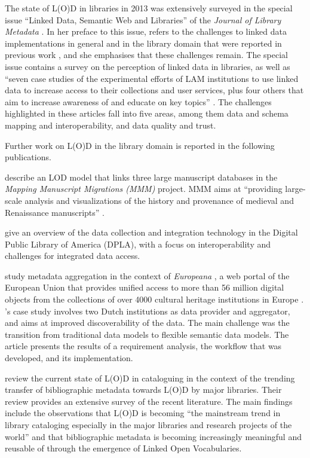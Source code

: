 The state of L(O)D in libraries in 2013 was extensively surveyed in the special issue
\enquote{Linked Data, Semantic Web and Libraries} of the \emph{Journal of Library Metadata} \autocite{JLM13_2-3}.
In her preface to this issue, \textcite{Bair2013} refers to the challenges to linked data implementations
in general and in the library domain that were reported in previous work
\autocite{Bizer2009,Byrne2010,Gonzalez2011,Alemu2012},
and she emphasises that these challenges remain.
The special issue contains a survey on the perception of linked data in libraries,
as well as
\enquote{seven case studies of the experimental efforts of LAM institutions to use linked data to increase access to their collections and user services, plus four others that aim to increase awareness of and educate on key topics} \autocite[p.76]{Bair2013}.
The challenges highlighted in these articles fall into five areas,
among them data and schema mapping and interoperability, and data quality and trust.

Further work on L(O)D in the library domain is reported in the following publications.

\textcite{Burrows2021} describe an LOD model that links
three large manuscript databases
in the \emph{Mapping Manuscript Migrations (MMM)} project.
MMM aims at \enquote{providing large-scale analysis and visualizations of the history and provenance of medieval and Renaissance manuscripts} \autocite[p.3]{Burrows2021}.

\textcite{LigiaTriques2022} give an overview of the data collection and integration technology
in the Digital Public Library of America (DPLA), with a focus on
interoperability and challenges for integrated data access.

\textcite{Freire2019} study metadata aggregation in the context of \emph{Europeana} \autocite{Isaac2012,Petras2017},
a web portal of the European Union that provides unified access to 
more than 56 million digital objects
from the collections of over 4000 cultural heritage institutions in Europe \autocite{Europeana}.
\citeauthor{Freire2019}'s case study involves two Dutch institutions as data provider and aggregator,
and aims at improved discoverability of the data.
The main challenge was the transition from traditional data models to flexible semantic data models.
The article presents the results of a requirement analysis,
the workflow that was developed, and its implementation.

\textcite{Ullah2018} review the current state of L(O)D in cataloguing
in the context of the trending transfer of bibliographic metadata
towards L(O)D by major libraries.
Their review provides an extensive survey of the recent literature.
The main findings include
the observations that L(O)D is becoming
\enquote{the mainstream trend in library cataloging especially in the major libraries and research projects of the world} \autocite[p.47]{Ullah2018}
and that bibliographic metadata is becoming increasingly meaningful and reusable of through the emergence of Linked Open Vocabularies.


